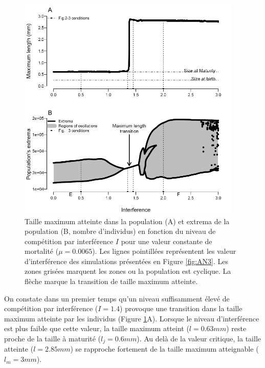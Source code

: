 \begin{figure}[!ht]
\begin{center}
\includegraphics[width=0.95\textwidth]{1_CorpsDeThese/Resumes/Fig/AN02}
\caption[Bifurcation sur le
niveau d'interférence]{Taille maximum atteinte dans la population (A) et extrema
de la population (B, nombre d'individus) en fonction du niveau de compétition par interférence $I$ pour une
valeur constante de mortalité ($\mu = 0.0065$). Les lignes pointillées
représentent les valeur d'interférence des simulations présentées en Figure
\ref{fig:AN3}. Les zones grisées marquent les zones ou la population est
cyclique. La flèche marque la transition de taille maximum atteinte.}
\label{fig:AN2}
\end{center}
\end{figure}

On constate dans un premier temps qu'un niveau suffisamment élevé de compétition
par interférence ($I=1.4$) provoque une transition dans la taille maximum
atteinte par les individus (Figure \ref{fig:AN2}A). Lorsque le niveau
d'interférence est plus faible que cette valeur, la taille maximum atteint ($l=0.63mm$) reste proche de la taille à
maturité ($l_j=0.6mm$). Au delà de la valeur critique, la taille atteinte
($l=2.85mm$) se rapproche fortement de la taille maximum atteignable
($l_m=3mm$). 

